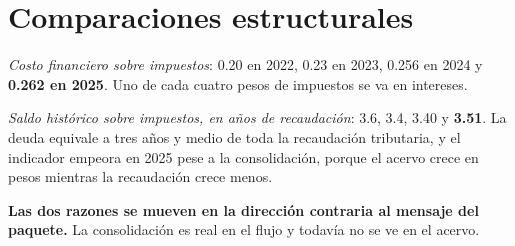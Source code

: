 



\section{Comparaciones estructurales}

\emph{Costo financiero sobre impuestos}: 0.20 en 2022, 0.23 en 2023, 0.256 en 2024
y \textbf{0.262 en 2025}. Uno de cada cuatro pesos de impuestos se va en intereses.

\emph{Saldo histórico sobre impuestos, en años de recaudación}: 3.6, 3.4, 3.40 y
\textbf{3.51}. La deuda equivale a tres años y medio de toda la recaudación
tributaria, y el indicador empeora en 2025 pese a la consolidación, porque el
acervo crece en pesos mientras la recaudación crece menos.

\textbf{Las dos razones se mueven en la dirección contraria al mensaje del
paquete.} La consolidación es real en el flujo y todavía no se ve en el acervo.

\clearpage
